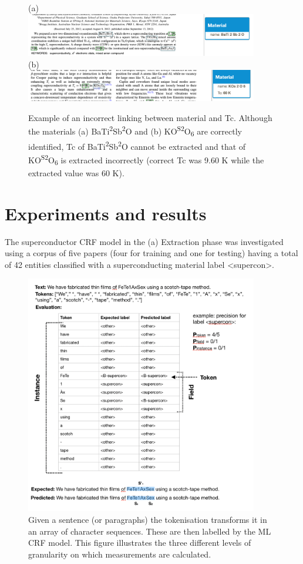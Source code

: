 \documentclass{article}[a4]
\begin{document}
\begin{figure}[h]
    \centering
    (a) \\
    \includegraphics[width=4in]{example-bad1}  \\
    (b) \\
    \includegraphics[width=4in]{example-bad2}
    \caption{Example of an incorrect linking between material and Tc. Although the materials (a) BaTi\textsuperscript{2}Sb\textsuperscript{2}O and (b) KO\textsuperscript{S2}O\textsubscript{6} are correctly identified, Tc of BaTi\textsuperscript{2}Sb\textsuperscript{2}O cannot be extracted and that of KO\textsuperscript{S2}O\textsubscript{6} is extracted incorrectly (correct Tc was 9.60 K while the extracted value was 60 K).}
    \label{fig:example-not-working}
\end{figure}

\section{Experiments and results}
\label{sec:experiments-results}
The superconductor CRF model in the (a) Extraction phase was investigated using a corpus of five papers (four for training and one for testing) having a total of 42 entities classified with a superconducting material label \textless supercon\textgreater.

\begin{figure}[h!]
    \centering
    \includegraphics[width=4in]{example-output}
    \caption{Given a sentence (or paragraphs) the tokenisation transforms it in an array of character sequences. These are then labelled by the ML CRF model. This figure illustrates the three different levels of granularity on which measurements are calculated.}
    \label{fig:levels-measurement}
\end{figure}
\end{document}
